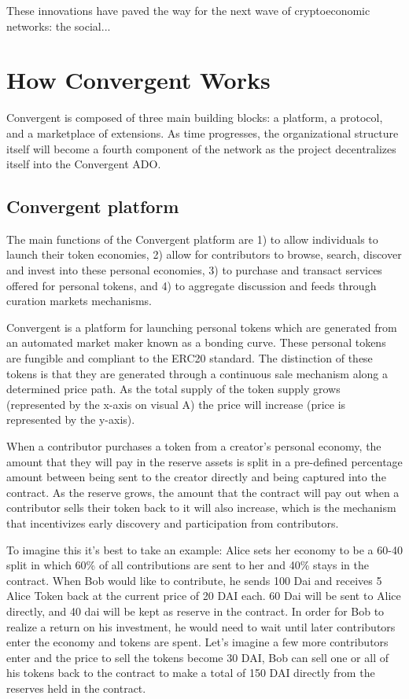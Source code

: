 \documentclass[a4paper]{article}
\begin{document}
    
    
    These innovations have paved the way for the next wave of cryptoeconomic networks: the social...

\section{How Convergent Works}

	Convergent is composed of three main building blocks: a platform, a protocol, and a marketplace of extensions. As time progresses, the organizational structure itself will become a fourth component of the network as the project decentralizes itself into the Convergent ADO. 

\subsection{Convergent platform}

	The main functions of the Convergent platform are 1) to allow individuals to launch their token economies, 2) allow for contributors to browse, search, discover and invest into these personal economies, 3) to purchase and transact services offered for personal tokens, and 4) to aggregate discussion and feeds through curation markets mechanisms.

	Convergent is a platform for launching personal tokens which are generated from an automated market maker known as a bonding curve. These personal tokens are fungible and compliant to the ERC20 standard. The distinction of these tokens is that they are generated  through a continuous sale mechanism along a determined price path. As the total supply of the token supply grows (represented by the x-axis on visual A) the price will increase (price is represented by the y-axis).
    
	When a contributor purchases a token from a creator’s personal economy, the amount that they will pay in the reserve assets is split in a pre-defined percentage amount between being sent to the creator directly and being captured into the contract. As the reserve grows, the amount that the contract will pay out when a contributor sells their token back to it will also increase, which is the mechanism that incentivizes early discovery and participation from contributors. 

To imagine this it’s best to take an example: Alice sets her economy to be a 60-40 split in which 60\% of all contributions are sent to her and 40\% stays in the contract. When Bob would like to contribute, he sends 100 Dai and receives 5 Alice Token back at the current price of 20 DAI each. 60 Dai will be sent to Alice directly, and 40 dai will be kept as reserve in the contract. In order for Bob to realize a return on his investment, he would need to wait until later contributors enter the economy and tokens are spent. Let’s imagine a few more contributors enter and the price to sell the tokens become 30 DAI, Bob can sell one or all of his tokens back to the contract to make a total of 150 DAI directly from the reserves held in the contract.
\end{document}
